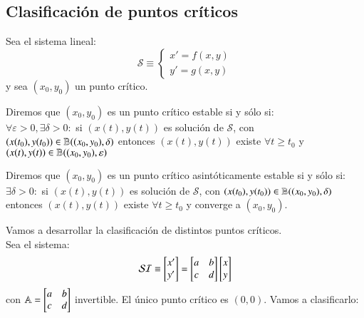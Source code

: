 \subsection{Clasificaci\'on de puntos cr\'iticos}
Sea el sistema lineal:
$$
    \mathcal{S} \equiv \begin{cases}
        x' = f(x, y)\\
        y' = g(x, y)
    \end{cases}
$$
y sea $(x_0, y_0)$ un punto crítico.
\begin{dfn}
    Diremos que $(x_0, y_0)$ es un punto crítico estable si y sólo si:\\
    $\forall \varepsilon > 0, \exists \delta > 0 :$  si  $(x(t), y(t))$  es solución de  $\mathcal{S}$, con $(x(t_0), y(t_0)) \in \mathbb{B}((x_0, y_0), \delta)$ entonces $(x(t), y(t))$ existe $\forall t \geq t_0$ y $(x(t), y(t)) \in \mathbb{B}((x_0, y_0), \varepsilon)$
\end{dfn}
\begin{dfn}
    Diremos que $(x_0, y_0)$ es un punto crítico asintóticamente estable si y sólo si:\\
    $\exists \delta > 0 : $ si  $(x(t), y(t))$  es solución de  $\mathcal{S}$, con $(x(t_0), y(t_0)) \in \mathbb{B}((x_0, y_0), \delta)$ entonces $(x(t), y(t))$ existe $\forall t \geq t_0$ y converge a $(x_0, y_0)$.
\end{dfn}
Vamos a desarrollar la clasificación de distintos puntos críticos.\\
Sea el sistema:
$$
    \mathcal{SI} \equiv \mx{x'\\y'} = \mx{a & b\\ c & d} \mx{x \\ y}
$$
con $\A = \mx{a & b\\ c & d}$ invertible. El único punto crítico es $(0, 0)$.
Vamos a clasificarlo:
